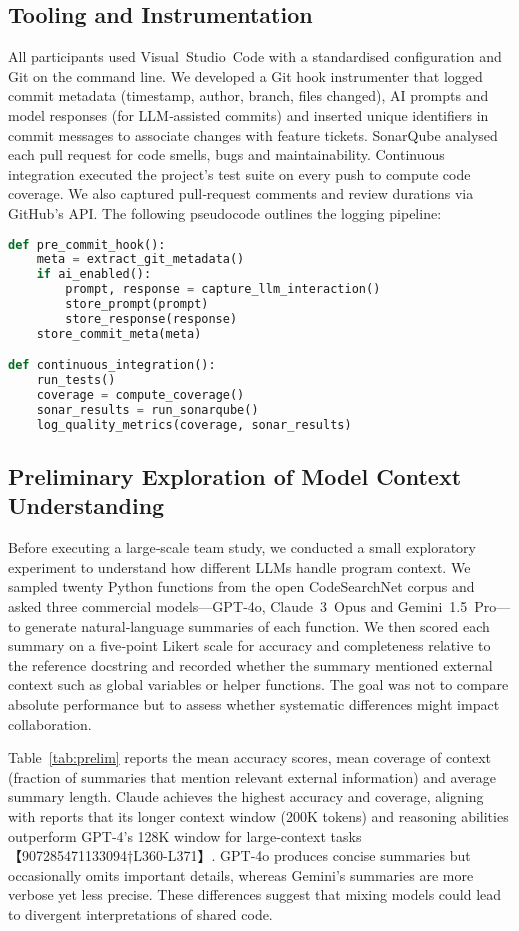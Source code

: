 \documentclass[conference]{IEEEtran}
\begin{document}
\subsection{Tooling and Instrumentation}
All participants used Visual Studio Code with a standardised configuration and Git on the command line.  We developed a Git hook instrumenter that logged commit metadata (timestamp, author, branch, files changed), AI prompts and model responses (for LLM‑assisted commits) and inserted unique identifiers in commit messages to associate changes with feature tickets.  SonarQube analysed each pull request for code smells, bugs and maintainability.  Continuous integration executed the project’s test suite on every push to compute code coverage.  We also captured pull‑request comments and review durations via GitHub’s API.  The following pseudocode outlines the logging pipeline:

\begin{lstlisting}[language=Python, caption={Simplified data‑collection pipeline.}]
def pre_commit_hook():
    meta = extract_git_metadata()
    if ai_enabled():
        prompt, response = capture_llm_interaction()
        store_prompt(prompt)
        store_response(response)
    store_commit_meta(meta)

def continuous_integration():
    run_tests()
    coverage = compute_coverage()
    sonar_results = run_sonarqube()
    log_quality_metrics(coverage, sonar_results)
\end{lstlisting}
\subsection{Preliminary Exploration of Model Context Understanding}

Before executing a large‑scale team study, we conducted a small exploratory experiment to understand how different LLMs handle program context.  We sampled twenty Python functions from the open CodeSearchNet corpus and asked three commercial models—GPT‑4o, Claude 3 Opus and Gemini 1.5 Pro—to generate natural‑language summaries of each function.  We then scored each summary on a five‑point Likert scale for accuracy and completeness relative to the reference docstring and recorded whether the summary mentioned external context such as global variables or helper functions.  The goal was not to compare absolute performance but to assess whether systematic differences might impact collaboration.

Table~\ref{tab:prelim} reports the mean accuracy scores, mean coverage of context (fraction of summaries that mention relevant external information) and average summary length.  Claude achieves the highest accuracy and coverage, aligning with reports that its longer context window (200K tokens) and reasoning abilities outperform GPT‑4’s 128K window for large‑context tasks【907285471133094†L360-L371】.  GPT‑4o produces concise summaries but occasionally omits important details, whereas Gemini’s summaries are more verbose yet less precise.  These differences suggest that mixing models could lead to divergent interpretations of shared code.
\end{document}
